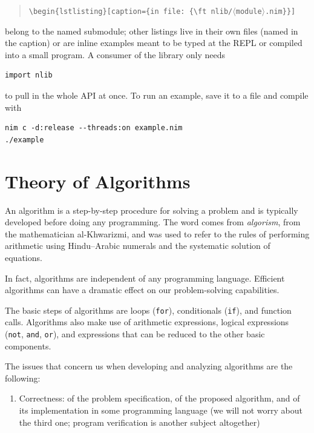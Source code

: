 \documentclass[justified, sixbynine]{tufte-book}
\def\ft{\small\tt}
\theoremstyle{plain}%
\newtheorem * {corollary}{Corollary}
\theoremstyle{definition}
\theoremstyle{remark}
\newtheorem * {remark}{Remark}
\newtheorem * {note}{Note}
\begin{document}
\begin{fullwidth}
\begin{quote}
{\ft \textbackslash begin\{lstlisting\}[caption=\{in file: \{\textbackslash ft nlib/$\langle$module$\rangle$.nim\}\}]}
\end{quote}

belong to the named submodule; other listings live in their own files (named in the caption) or are inline examples meant to be typed at the REPL or compiled into a small program. A consumer of the library only needs

\begin{lstlisting}
import nlib
\end{lstlisting}

to pull in the whole API at once. To run an example, save it to a file and compile with

\begin{lstlisting}
nim c -d:release --threads:on example.nim
./example
\end{lstlisting}

\chapter{Theory of Algorithms}

An algorithm is a step-by-step procedure for solving a problem and is typically developed before doing any programming.
The word comes from {\it algorism}, from the mathematician al-Khwarizmi, and was used to refer to the rules of performing arithmetic using Hindu--Arabic numerals and the systematic solution of equations.

In fact, algorithms are independent
of any programming language. Efficient algorithms can have a dramatic effect
on our problem-solving capabilities.

The basic steps of algorithms are loops ({\ft for}), conditionals ({\ft if}), and function calls.
Algorithms also make use of arithmetic expressions, logical expressions ({\ft not}, {\ft and}, {\ft or}), and expressions that can be reduced to the other basic components.

The issues that concern us when developing and analyzing algorithms are the following:

\begin{enumerate}
\item  Correctness: of the problem specification, of the proposed algorithm, 
and of its implementation in some programming language (we will not worry
about the third one; program verification is another subject altogether)


\end{enumerate}
\end{fullwidth}
\end{document}
